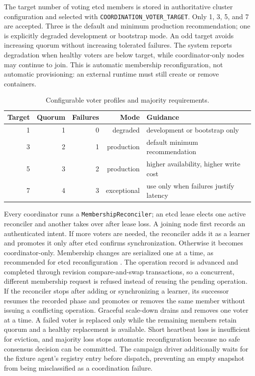The target number of voting etcd members is stored in authoritative cluster configuration and selected with \texttt{COORDINATION\_VOTER\_TARGET}. Only 1, 3, 5, and 7 are accepted. Three is the default and minimum production recommendation; one is explicitly degraded development or bootstrap mode. An odd target avoids increasing quorum without increasing tolerated failures. The system reports degradation when healthy voters are below target, while coordinator-only nodes may continue to join. This is automatic membership reconfiguration, not automatic provisioning: an external runtime must still create or remove containers.

\begin{table}[htbp]
\centering
\caption{Configurable voter profiles and majority requirements.}
\label{tab:voter-profiles}
\begin{tabular}{rrrrl}
\toprule
\textbf{Target} & \textbf{Quorum} & \textbf{Failures} & \textbf{Mode} & \textbf{Guidance} \\
\midrule
1 & 1 & 0 & degraded & development or bootstrap only \\
3 & 2 & 1 & production & default minimum recommendation \\
5 & 3 & 2 & production & higher availability, higher write cost \\
7 & 4 & 3 & exceptional & use only when failures justify latency \\
\bottomrule
\end{tabular}
\end{table}

Every coordinator runs a \texttt{MembershipReconciler}; an etcd lease elects one active reconciler and another takes over after lease loss. A joining node first records an authenticated intent. If more voters are needed, the reconciler adds it as a learner and promotes it only after etcd confirms synchronization. Otherwise it becomes coordinator-only. Membership changes are serialized one at a time, as recommended for etcd reconfiguration \cite{etcdreconfiguration}. The operation record is advanced and completed through revision compare-and-swap transactions, so a concurrent, different membership request is refused instead of reusing the pending operation. If the reconciler stops after adding or synchronizing a learner, its successor resumes the recorded phase and promotes or removes the same member without issuing a conflicting operation. Graceful scale-down drains and removes one voter at a time. A failed voter is replaced only while the remaining members retain quorum and a healthy replacement is available. Short heartbeat loss is insufficient for eviction, and majority loss stops automatic reconfiguration because no safe consensus decision can be committed. The campaign driver additionally waits for the fixture agent's registry entry before dispatch, preventing an empty snapshot from being misclassified as a coordination failure.


